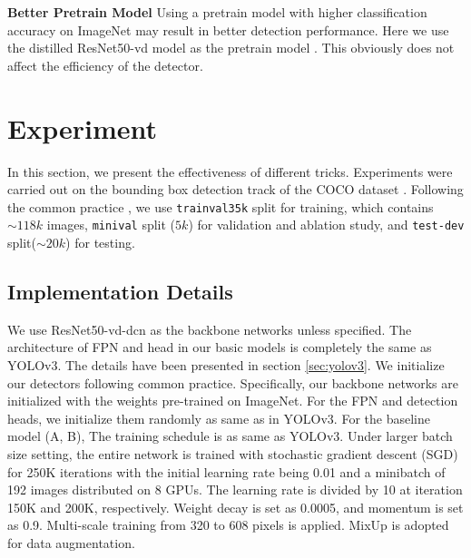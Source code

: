 \documentclass[10pt,twocolumn,letterpaper]{article}
\newcommand{\pheadB}[1] {\vspace{1mm}\noindent\textbf{#1}}
\begin{document}
	\pheadB{Better Pretrain Model}
	Using a pretrain model with higher classification accuracy on ImageNet may result in better detection performance. Here we use the distilled ResNet50-vd model as the pretrain model \cite{pretrain} . This obviously does not affect the efficiency of the detector.
	
	
	\section{Experiment}
	
	In this section, we present the effectiveness of different tricks.
	Experiments were carried out on the bounding box detection track of the COCO dataset \cite{coco}. 
	Following the common practice \cite{yolov3,Mingxing2020EfficientDet,yolov4}, we use \texttt{trainval35k} split for training, which contains $\sim \! \! 118k$ images, \texttt{minival} split ($5k$) for validation and ablation study, and \texttt{test-dev} split($\sim \! \! 20k$) for testing. 
	
	\subsection{Implementation Details} \label{sec:detail}
	
	We use ResNet50-vd-dcn\cite{resnet} as the backbone networks unless specified. The architecture of FPN and head in our basic models is completely the same as YOLOv3\cite{yolov3}. The details have been presented in section \ref{sec:yolov3}.
	We initialize our detectors following common practice. Specifically, our backbone networks are initialized with the weights pre-trained
	on ImageNet\cite{imagenet}. For the FPN and detection heads, we initialize them randomly as same as in YOLOv3\cite{yolov3}.
	For the baseline model (A, B), The training schedule is as same as YOLOv3. Under larger batch size setting, the entire network is trained with stochastic gradient descent (SGD) for 250K iterations with the initial learning rate being 0.01 and a minibatch of 192 images distributed on 8 GPUs. The learning rate is divided by 10 at iteration 150K and 200K, respectively. Weight decay is set as 0.0005, and momentum is set as 0.9. 
	Multi-scale training from 320 to 608 pixels is applied. MixUp\cite{mixup} is adopted for data augmentation. 
	
\end{document}

